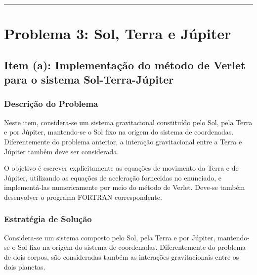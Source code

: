 \documentclass[12pt,a4paper]{article}
\begin{document}
\vspace{0.5cm}
\hrule
\vspace{0.5cm}

\section{Problema 3: Sol, Terra e Júpiter}

\subsection{Item (a): Implementação do método de Verlet para o sistema Sol-Terra-Júpiter}

\subsubsection{Descrição do Problema}

Neste item, considera-se um sistema gravitacional constituído pelo Sol, pela Terra e por Júpiter, mantendo-se o Sol fixo na origem do sistema de coordenadas. Diferentemente do problema anterior, a interação gravitacional entre a Terra e Júpiter também deve ser considerada.

O objetivo é escrever explicitamente as equações de movimento da Terra e de Júpiter, utilizando as equações de aceleração fornecidas no enunciado, e implementá-las numericamente por meio do método de Verlet. Deve-se também desenvolver o programa FORTRAN correspondente.

\subsubsection{Estratégia de Solução}

Considera-se um sistema composto pelo Sol, pela Terra e por Júpiter, mantendo-se o Sol fixo na origem do sistema de coordenadas. Diferentemente do problema de dois corpos, são consideradas também as interações gravitacionais entre os dois planetas.
\end{document}

